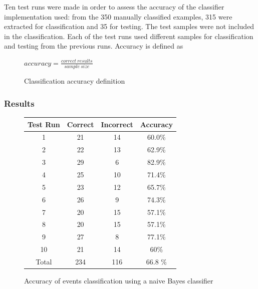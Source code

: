 \documentclass{llncs}
\begin{document}
Ten test runs were made in order to assess the accuracy of the classifier implementation used: from the 350 manually classified examples, 315 were extracted for classification and 35 for testing. The test samples were not included in the classification. Each of the test runs used different samples for classification and testing from the previous runs. Accuracy is defined as
\begin{figure}
	\centering
	\Large{$accuracy = \frac{correct\ results}{sample\ size}$}
	\caption{Classification accuracy definition}
\end{figure}

\subsubsection{Results}

\begin{figure}[h!]
	\centering
	\begin{tabular}{c|c|c|c}
	\textbf{Test Run} & \textbf{Correct} & \textbf{Incorrect} & \textbf{Accuracy}\\
	\hline
	1 & 21 & 14 & 60.0\% \\
	2 & 22 & 13 & 62.9\% \\
	3 & 29 & 6 & 82.9\% \\
	4 & 25 & 10 & 71.4\% \\
	5 & 23 & 12 & 65.7\% \\
	6 & 26 & 9 & 74.3\% \\
	7 & 20 & 15 & 57.1\% \\
	8 & 20 & 15 & 57.1\% \\
	9 & 27 & 8 & 77.1\% \\
	10 & 21 & 14 & 60\% \\
	\hline
	Total & 234 & 116 & 66.8 \%
	\end{tabular}
	\caption{Accuracy of events classification using a naive Bayes classifier}
	\label{fig:classifier-accuracy}
\end{figure}
\end{document}
